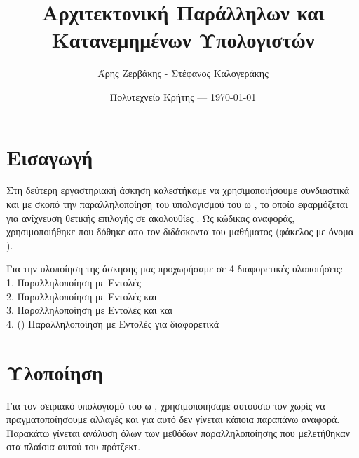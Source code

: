 \documentclass{article}
\title{Αρχιτεκτονική Παράλληλων και Κατανεμημένων Υπολογιστών} %
\author{Άρης Ζερβάκης - Στέφανος Καλογεράκης} %
\date{Πολυτεχνείο Κρήτης --- \today} %
\begin{document}
\maketitle %


\section*{Εισαγωγή} %
Στη δεύτερη εργαστηριακή άσκηση καλεστήκαμε να χρησιμοποιήσουμε συνδιαστικά  και  με σκοπό την παραλληλοποίηση του υπολογισμού του ω , το οποίο εφαρμόζεται για ανίχνευση θετικής επιλογής σε ακολουθίες . Ως κώδικας αναφοράς, χρησιμοποιήθηκε που δόθηκε απο τον διδάσκοντα του μαθήματος (φάκελος με όνομα ).\\
\begin{warn}[] %
	Για την υλοποίηση της άσκησης μας προχωρήσαμε σε 4 διαφορετικές υλοποιήσεις:\\
    1. Παραλληλοποίηση με  Εντολές\\
    2. Παραλληλοποίηση με  Εντολές και \\
    3. Παραλληλοποίηση με  Εντολές και  και \\
    4. () Παραλληλοποίηση με  Εντολές για διαφορετικά 
\end{warn}


\section{Υλοποίηση} %
Για τον σειριακό υπολογισμό του ω , χρησιμοποιήσαμε αυτούσιο τον  χωρίς να πραγματοποίησουμε αλλαγές και για αυτό δεν γίνεται κάποια παραπάνω αναφορά. Παρακάτω γίνεται ανάλυση όλων των μεθόδων παραλληλοποίησης που μελετήθηκαν στα πλαίσια αυτού του πρότζεκτ.\\
\end{document}
